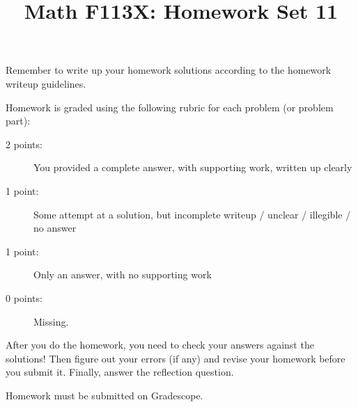 \documentclass[11pt, oneside]{article}   	%
\title{Math F113X: Homework Set 11}
\date{}							%
\begin{document}
\maketitle

\vspace{-1.5cm}



\hrulefill

Remember to write up your homework solutions according to the homework writeup guidelines. 

Homework is graded using the following rubric for each problem (or problem part):

\begin{description}
\item[2 points:] You provided a complete answer, with supporting work, written up clearly
\item[1 point:] Some attempt at a solution, but incomplete writeup / unclear / illegible / no answer
\item[1 point:] Only an answer, with no supporting work 
\item[0 points:] Missing.
\end{description}

After you do the homework, you need to check your answers against the solutions! Then figure out your errors (if any) and revise your homework before you submit it. Finally, answer the reflection question.

Homework must be submitted on Gradescope.
\end{document}
